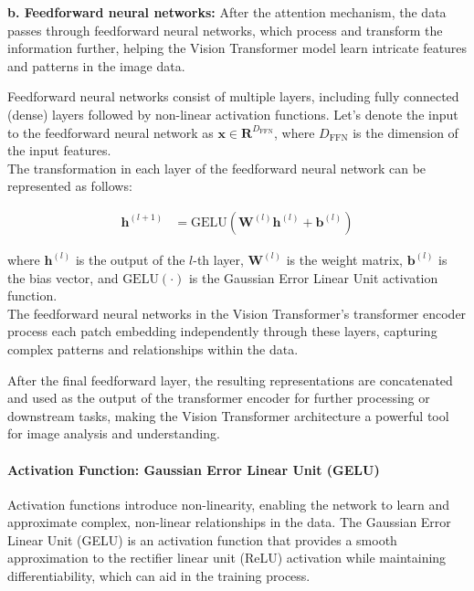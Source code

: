 \noindent \textbf{b. Feedforward neural networks:} After the attention mechanism, the data passes through feedforward neural networks, which process and transform the information further, helping the Vision Transformer model learn intricate features and patterns in the image data.

\noindent Feedforward neural networks consist of multiple layers, including fully connected (dense) layers followed by non-linear activation functions. Let's denote the input to the feedforward neural network as $\mathbf{x} \in \mathbf{R}^{D_{\text{FFN}}}$, where $D_{\text{FFN}}$ is the dimension of the input features.
\\

\noindent The transformation in each layer of the feedforward neural network can be represented as follows:

\begin{align}
    \mathbf{h}^{(l+1)} & = \text{GELU}\left(\mathbf{W}^{(l)} \mathbf{h}^{(l)} + \mathbf{b}^{(l)}\right) \label{eq:feedforward}
\end{align}

where $\mathbf{h}^{(l)}$ is the output of the $l$-th layer, $\mathbf{W}^{(l)}$ is the weight matrix, $\mathbf{b}^{(l)}$ is the bias vector, and $\text{GELU}(\cdot)$ is the Gaussian Error Linear Unit activation function.
\\

\noindent The feedforward neural networks in the Vision Transformer's transformer encoder process each patch embedding independently through these layers, capturing complex patterns and relationships within the data.

\noindent After the final feedforward layer, the resulting representations are concatenated and used as the output of the transformer encoder for further processing or downstream tasks, making the Vision Transformer architecture a powerful tool for image analysis and understanding.

\paragraph{Activation Function: Gaussian Error Linear Unit (GELU)}
Activation functions introduce non-linearity, enabling the network to learn and approximate complex, non-linear relationships in the data.
The Gaussian Error Linear Unit (GELU) is an activation function that provides a smooth approximation to the rectifier linear unit (ReLU) activation while maintaining differentiability, which can aid in the training process.

